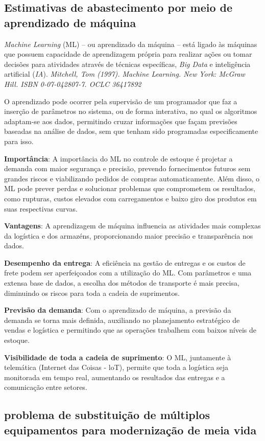 \documentclass{article}
\begin{document}
\subsection{Estimativas de abastecimento por meio de aprendizado de máquina}

{\it Machine Learning} (ML) – ou aprendizado da máquina – está ligado às máquinas que possuem capacidade de aprendizagem própria para realizar ações ou tomar decisões para atividades através de técnicas específicas, {\it Big Data} e inteligência artificial ({\it IA}). {\it Mitchell, Tom (1997). Machine Learning. New York: McGraw Hill. ISBN 0-07-042807-7. OCLC 36417892}  

O aprendizado pode ocorrer pela supervisão de um programador que faz a inserção de parâmetros no sistema, ou de forma interativa, no qual os algoritmos adaptam-se aos dados, permitindo cruzar informações que façam previsões baseadas na análise de dados, sem que tenham sido programadas especificamente para isso.

{\bf Importância}: A importância do ML no controle de estoque é projetar a demanda com maior segurança e precisão, prevendo fornecimentos futuros sem grandes riscos e viabilizando pedidos de compras automaticamente. Além disso, o ML pode prever perdas e solucionar problemas que comprometem os resultados, como rupturas, custos elevados com carregamentos e baixo giro dos produtos em suas respectivas curvas.

{\bf Vantagens}: A aprendizagem de máquina influencia as atividades mais complexas da logística e dos armazéns, proporcionando maior precisão e transparência nos dados.

{\bf Desempenho da entrega}: A eficiência na gestão de entregas e os custos de frete podem ser aperfeiçoados com a utilização do ML. Com parâmetros e uma extensa base de dados, a escolha dos métodos de transporte é mais precisa, diminuindo os riscos para toda a cadeia de suprimentos.

{\bf Previsão da demanda}: Com o aprendizado de máquina, a previsão da demanda se torna mais definida, auxiliando no planejamento estratégico de vendas e logística e permitindo que as operações trabalhem com baixos níveis de estoque.

{\bf Visibilidade de toda a cadeia de suprimento}: O ML, juntamente à telemática (Internet das Coisas - loT), permite que toda a logística seja monitorada em tempo real, aumentando os resultados das entregas e a comunicação entre setores.


\subsection{problema de substituição de múltiplos equipamentos para modernização de meia vida}
\end{document}
